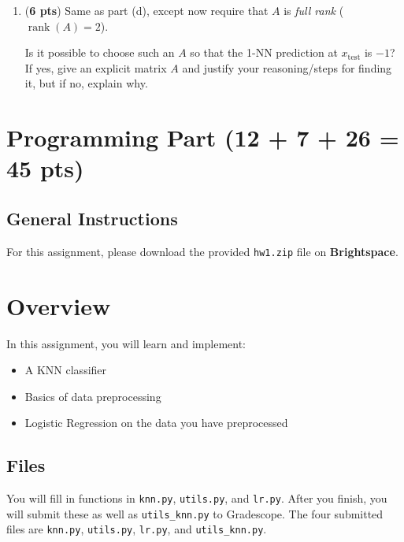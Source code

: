 \documentclass{article}
\begin{document}
\begin{enumerate}
\begin{tcolorbox}[breakable,enhanced,notitle,width=16.6cm,height=12cm]

\end{tcolorbox}

\newpage
\item[(e)] ({\bf 6 pts})
Same as part (d), except now require that \(A\) is \emph{full rank} (\(\operatorname{rank}(A)=2\)).

Is it possible to choose such an \(A\) so that the 1-NN prediction at \(x_{\text{test}}\) is \(-1\)?
If yes, give an explicit matrix \(A\) and justify your reasoning/steps for finding it, but if no, explain why.

\begin{tcolorbox}[breakable,enhanced,notitle,width=16.6cm,height=14cm]

\end{tcolorbox}

\end{enumerate}

\clearpage
\setcounter{section}{0}
\section*{Programming Part  (12 + 7 + 26 = 45 pts)} 

\subsection*{General Instructions}
For this assignment, please download the provided \verb|hw1.zip| file on \textbf{Brightspace}.


\section*{Overview}

In this assignment, you will learn and implement: 

\begin{itemize}
    \item A KNN classifier
    \item Basics of data preprocessing
    \item Logistic Regression on the data you have preprocessed 
\end{itemize}

\subsection*{Files}
You will fill in functions in \verb|knn.py|, \verb|utils.py|, and \verb|lr.py|. After you finish, you will submit these as well
as \verb|utils_knn.py| to Gradescope. The four submitted files are \verb|knn.py|, \verb|utils.py|, \verb|lr.py|, and \verb|utils_knn.py|.
\end{document}
